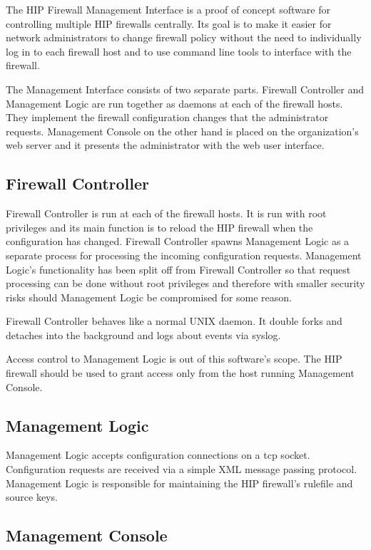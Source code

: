 \documentclass[a4paper,titlepage]{article}
\begin{document}
The HIP Firewall Management Interface is a proof of concept software
for controlling multiple HIP firewalls centrally. Its goal is to make
it easier for network administrators to change firewall policy without
the need to individually log in to each firewall host and to use
command line tools to interface with the firewall.

The Management Interface consists of two separate parts. Firewall
Controller and Management Logic are run together as daemons at each of
the firewall hosts. They implement the firewall configuration changes
that the administrator requests. Management Console on the other hand
is placed on the organization's web server and it presents the
administrator with the web user interface.

\subsection{Firewall Controller}

Firewall Controller is run at each of the firewall hosts. It is run
with root privileges and its main function is to reload the HIP
firewall when the configuration has changed. Firewall Controller
spawns Management Logic as a separate process for processing the
incoming configuration requests. Management Logic's functionality has
been split off from Firewall Controller so that request processing can
be done without root privileges and therefore with smaller security
risks should Management Logic be compromised for some reason.

Firewall Controller behaves like a normal UNIX daemon. It double forks
and detaches into the background and logs about events via syslog.

Access control to Management Logic is out of this software's
scope. The HIP firewall should be used to grant access only from the
host running Management Console.

\subsection{Management Logic}

Management Logic accepts configuration connections on a tcp socket.
Configuration requests are received via a simple XML message passing
protocol. Management Logic is responsible for maintaining the HIP
firewall's rulefile and source keys.

\subsection{Management Console}
\end{document}
